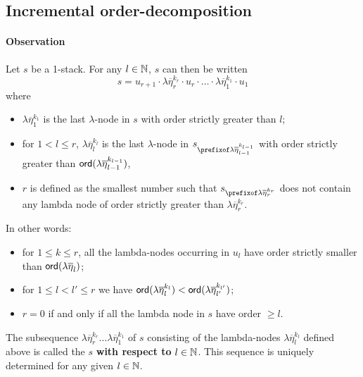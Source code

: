 \documentclass[a4paper]{article}
\theoremstyle{remark}
\theoremstyle{definition}
\begin{document}
\subsection{Incremental order-decomposition}
\paragraph{Observation}
Let $s$ be a 1-stack. For any $l\in \mathbb{N}$, $s$ can then be written
$$ s = u_{r+1} \cdot \lambda \overline{\eta}_r^{k_r} \cdot u_r \cdot
\ldots \cdot \lambda \overline{\eta}_1^{k_1} \cdot  u_1 $$
where
\begin{itemize}
\item  $\lambda \overline{\eta}_1^{k_1}$ is the
last $\lambda$-node in $s$ with order strictly greater than $l$;

\item for $1 < l \leq r$, $\lambda
\overline{\eta}_l^{k_l}$ is the last $\lambda$-node in $s_{\prefixof
\lambda \overline{\eta}_{l-1}^{k_{l-1}}}$ with order strictly
greater than ${\sf ord}(\lambda \overline{\eta}_{l-1}^{k_{l-1}})$,

\item  $r$ is defined as the smallest number such that
$s_{\prefixof \lambda \overline{\eta}_{r}^{k_{r}}}$ does not contain
any lambda node of order strictly greater than $\lambda
\overline{\eta}_{r}^{k_{r}}$.
\end{itemize}

\noindent In other words:
\begin{itemize}
\item for $1 \leq k \leq r$, all the lambda-nodes occurring in $u_l$ have order
strictly smaller than ${\sf ord}(\lambda \overline{\eta}_l)$;
\item for $1\leq l<l'\leq r$ we have ${\sf ord}(\lambda \overline{\eta}_l^{k_l})
< {\sf ord}(\lambda \overline{\eta}_{l'}^{k_{l'}})$;
\item $r=0$ if and only if all the lambda node in $s$ have order $\geq l$.
\end{itemize}

The subsequence $\lambda \overline{\eta}_r^{k_r} \ldots \lambda\overline{\eta}_1^{k_1}$ of $s$ consisting of the lambda-nodes $\lambda
\overline{\eta}_l^{k_l}$ defined above is called the  $s$ {\bf with respect to} $l\in\mathbb{N}$.
This sequence is uniquely determined for any given $l\in \mathbb{N}$.

\smallskip
\end{document}
